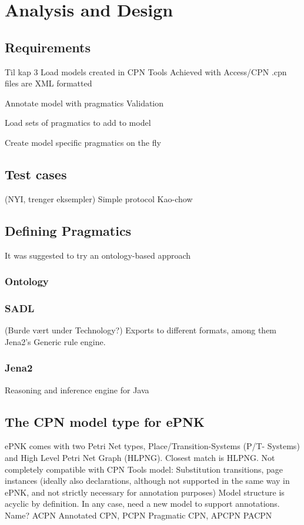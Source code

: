\chapter{Analysis and Design}
\label{chap:analysis}

\section{Requirements} Til kap 3
Load models created in CPN Tools
	Achieved with Access/CPN
	.cpn files are XML formatted

Annotate model with pragmatics
	Validation

Load sets of pragmatics to add to model

Create model specific pragmatics on the fly

\section{Test cases}

(NYI, trenger eksempler)
Simple protocol
Kao-chow


\section{Defining Pragmatics}

It was suggested to try an ontology-based approach

	\subsection{Ontology}
	\subsection{SADL}
	(Burde vært under Technology?)
	Exports to different formats, among them Jena2's Generic rule engine.
	\subsection{Jena2}
	Reasoning and inference engine for Java


\section{The CPN model type for ePNK}
ePNK comes with two Petri Net types, Place/Transition-Systems (P/T-
Systems) and High Level Petri Net Graph (HLPNG). Closest match is HLPNG.
Not completely compatible with CPN Tools model: Substitution transitions, page
instances (ideally also declarations, although not supported in the same way in
ePNK, and not strictly necessary for annotation purposes)
Model structure is acyclic by definition.
In any case, need a new model to support annotations. 
Name? ACPN Annotated CPN, PCPN Pragmatic CPN, APCPN PACPN


